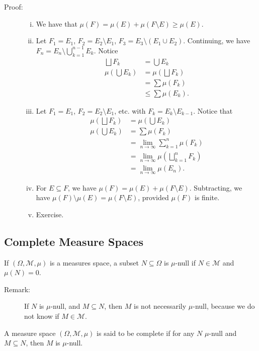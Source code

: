 \documentclass[9pt]{extarticle}
\begin{document}
  \begin{description}
    \item[Proof:]\hfill
      \begin{enumerate}[(i)]
        \item We have that $\mu(F) = \mu(E) + \mu(F\setminus E)\geq \mu(E)$.
        \item Let $F_1 = E_1$, $F_2 = E_2\setminus E_1$, $F_3 = E_3 \setminus (E_1\cup E_2)$. Continuing, we have $F_n = E_n \setminus \bigcup_{k=1}^{n-1} E_k$. Notice
          \begin{align*}
            \bigsqcup F_k &= \bigcup E_k\\
            \mu\left(\bigcup E_k\right) &= \mu\left(\bigsqcup F_k\right)\\
                                        &= \sum \mu(F_k)\\
                                        &\leq \sum \mu(E_k).
          \end{align*}
        \item Let $F_1 = E_1$, $F_2 = E_2 \setminus E_1$, etc. with $F_k = E_k \setminus E_{k-1}$. Notice that
          \begin{align*}
            \mu\left(\bigsqcup F_k\right) &= \mu\left(\bigcup E_k\right)\\
            \mu\left(\bigcup E_k\right) &= \sum \mu(F_k)\\
                                        &= \lim_{n\rightarrow\infty}\sum_{k=1}^{n}\mu(F_k)\\
                                        &= \lim_{n\rightarrow\infty} \mu\left(\bigsqcup_{k=1}^{n}F_k\right)\\
                                        &= \lim_{n\rightarrow\infty}\mu(E_n).
          \end{align*}
        \item For $E\subseteq F$, we have $\mu(F) = \mu(E) + \mu(F\setminus E)$. Subtracting, we have $\mu(F)\setminus \mu(E) = \mu(F\setminus E)$, provided $\mu(F)$ is finite.
        \item Exercise.
      \end{enumerate}
  \end{description}
  \subsection{Complete Measure Spaces}%
  If $(\Omega,\mathcal{M},\mu)$ is a measures space, a subset $N\subseteq \Omega$ is $\mu$-null if $N\in \mathcal{M}$ and $\mu(N) = 0$.
  \begin{description}
    \item[Remark:] If $N$ is $\mu$-null, and $M\subseteq N$, then $M$ is not necessarily $\mu$-null, because we do not know if $M\in \mathcal{M}$.
  \end{description}
  A measure space $(\Omega,\mathcal{M},\mu)$ is said to be complete if for any $N$ $\mu$-null and $M\subseteq N$, then $M$ is $\mu$-null.\\
\end{document}
